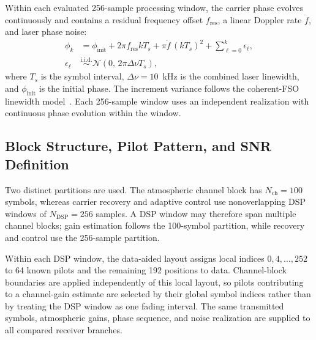 Within each evaluated 256-sample processing window, the carrier phase evolves continuously and contains a residual frequency offset \(f_{\mathrm{res}}\), a linear Doppler rate \(\dot f\), and laser phase noise:
\begin{equation}
  \begin{aligned}
  \phi_k
    &= \phi_{\mathrm{init}}+2\pi f_{\mathrm{res}}kT_s
       +\pi\dot f\,(kT_s)^2+\sum_{\ell=0}^{k}\epsilon_\ell,\\
  \epsilon_\ell &\overset{\mathrm{i.i.d.}}{\sim}
       \mathcal{N}\!\left(0,\,2\pi\Delta\nu T_s\right),
  \end{aligned}
  \label{eq:phase-process}
\end{equation}
where \(T_s\) is the symbol interval, \(\Delta\nu=10\)~kHz is the combined laser linewidth, and \(\phi_{\mathrm{init}}\) is the initial phase. The increment variance follows the coherent-FSO linewidth model~\cite{du2025nda}. Each 256-sample window uses an independent realization with continuous phase evolution within the window.

\subsection{Block Structure, Pilot Pattern, and SNR Definition}

Two distinct partitions are used. The atmospheric channel block has \(N_{\mathrm{ch}}=100\) symbols, whereas carrier recovery and adaptive control use nonoverlapping DSP windows of \(N_{\mathrm{DSP}}=256\) samples. A DSP window may therefore span multiple channel blocks; gain estimation follows the 100-symbol partition, while recovery and control use the 256-sample partition.

Within each DSP window, the data-aided layout assigns local indices \(0,4,\ldots,252\) to 64 known pilots and the remaining 192 positions to data. Channel-block boundaries are applied independently of this local layout, so pilots contributing to a channel-gain estimate are selected by their global symbol indices rather than by treating the DSP window as one fading interval. The same transmitted symbols, atmospheric gains, phase sequence, and noise realization are supplied to all compared receiver branches.


